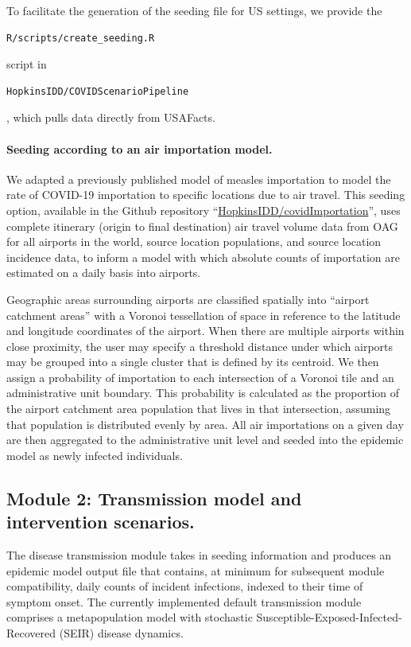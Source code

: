 To facilitate the generation of the seeding file for US settings, we provide the \begin{verbatim}R/scripts/create_seeding.R\end{verbatim} script in \begin{verbatim}HopkinsIDD/COVIDScenarioPipeline\end{verbatim}, which pulls data directly from USAFacts. 

\paragraph{Seeding according to an air importation model.} We adapted a previously published model of measles importation to model the rate of COVID-19 importation to specific locations due to air travel\cite{Truelove:EpidemicsAirTravel:2020}. This seeding option, available in the Github repository “\url{HopkinsIDD/covidImportation}”\cite{Truelove:HopkinsIDDCovidImportationInitial:2020}, uses complete itinerary (origin to final destination) air travel volume data from OAG\cite{OAG:FlightDataOAG} for all airports in the world, source location populations, and source location incidence data, to inform a model with which absolute counts of importation are estimated on a daily basis into airports. 

Geographic areas surrounding airports are classified spatially into “airport catchment areas” with a Voronoi tessellation of space in reference to the latitude and longitude coordinates of the airport\cite{Balcan:ModelingSpatialSpread:2010}. When there are multiple airports within close proximity, the user may specify a threshold distance under which airports may be grouped into a single cluster that is defined by its centroid. We then assign a probability of importation to each intersection of a Voronoi tile and an administrative unit boundary. This probability is calculated as the proportion of the airport catchment area population that lives in that intersection, assuming that population is distributed evenly by area. All air importations on a given day are then aggregated to the administrative unit level and seeded into the epidemic model as newly infected individuals.

\subsection{Module 2: Transmission model and intervention scenarios.}
The disease transmission module takes in seeding information and produces an epidemic model output file that contains, at minimum for subsequent module compatibility, daily counts of incident infections, indexed to their time of symptom onset. The currently implemented default transmission module comprises a metapopulation model with stochastic Susceptible-Exposed-Infected-Recovered (SEIR) disease dynamics.

